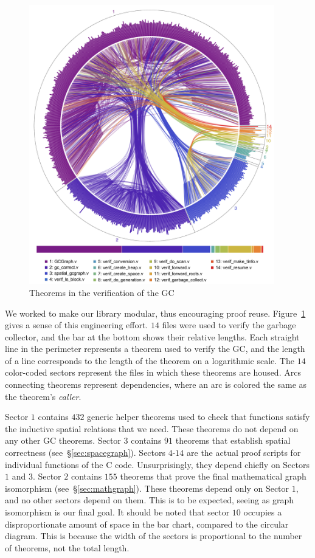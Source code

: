 \begin{figure}
\includegraphics[width=0.95\textwidth]{certigc_theorems}
\caption{Theorems in the verification of the GC}
\label{fig:connectedness}
\end{figure}

We worked to make our library modular, thus encouraging 
proof reuse. Figure~\ref{fig:connectedness} gives a sense of this 
engineering effort.
$14$ files were used to verify the garbage collector, and
the bar at the bottom shows their relative lengths.
Each straight line in the perimeter represents a theorem used to verify the GC, 
and the length of a line corresponds to the length of the theorem on a 
logarithmic scale. The $14$ color-coded sectors represent the files in which 
these theorems are housed. Arcs connecting theorems represent dependencies, 
where an arc is colored the same as the theorem's \emph{caller}.

Sector $1$ contains $432$ generic helper theorems used to check that functions
satisfy the inductive spatial relations that we need. These theorems do not depend
on any other GC theorems. Sector $3$ contains $91$ theorems that establish  
spatial correctness (see~\S\ref{sec:spacegraph}). Sectors $4$-$14$ are the actual
proof scripts for individual functions of the C code. Unsurprisingly, they depend
chiefly on Sectors $1$ and $3$. Sector $2$ contains $155$ theorems that 
prove the final mathematical graph isomorphism (see~\S\ref{sec:mathgraph}).
These theorems depend only on Sector $1$, 
and no other sectors depend on them. This is to be expected, seeing as graph
isomorphism is our final goal. It should be noted that sector $10$ occupies a
disproportionate amount of space in the bar chart, compared to the circular
diagram. This is because the width of the sectors is proportional to the number of
theorems, not the total length.

